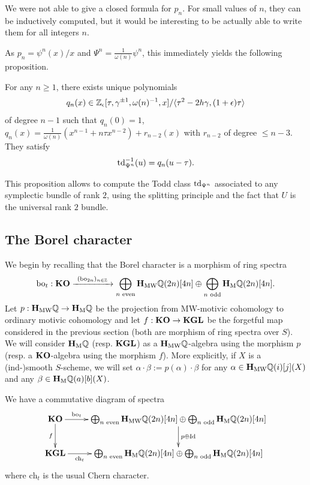 \begin{rem}
We were not able to give a closed formula for $p_n$. For small values of $n$, they can be inductively computed, but it would be interesting to be actually able to write them for all integers $n$.
\end{rem}

As $p_n=\psi^n(x)/x$ and $\Psi^n=\frac 1{\omega(n)}\psi^n$, this immediately yields the following proposition.

\begin{prop}
For any $n\geq 1$, there exists unique polynomials 
\[
q_n(x)\in  \mathbb{Z}_{\epsilon}[\tau,\gamma^{\pm 1},\omega(n)^{-1},x]/\langle \tau^2-2h\gamma,(1+\epsilon)\tau\rangle
\]
of degree $n-1$ such that $q_n(0)=1$, $q_n(x)=\frac 1{\omega(n)}(x^{n-1}+n\tau x^{n-2})+r_{n-2}(x)$ with $r_{n-2}$ of degree $\leq n-3$.  They satisfy 
\[
\operatorname{td}_{\Psi^n}^{-1}(u)=q_n(u-\tau).
\]
\end{prop}

This proposition allows to compute the Todd class $\operatorname{td}_{\Psi^n}$ associated to any symplectic bundle of rank $2$, using the splitting principle and the fact that $U$ is the universal rank $2$ bundle. 



\subsection{The Borel character}

We begin by recalling that the Borel character is a morphism of ring spectra 
\[
\mathrm{bo}_t:\KO \xrightarrow{\ (\mathrm{bo}_{2n})_{n \in \ZZ}\ } \bigoplus_{n \text{ even}} \mathbf{H}_\mathrm{MW}\QQ(2n)[4n] \oplus \bigoplus_{n \text{ odd}} \mathbf{H}_{\mathrm M} \QQ(2n)[4n].
\]
Let $p:\mathbf{H}_\mathrm{MW}\mathbb{Q}\to \mathbf{H}_\mathrm{M}\mathbb{Q}$ be the projection from MW-motivic cohomology to ordinary motivic cohomology and let $f:\mathbf{KO}\to \mathbf{KGL}$ be the forgetful map considered in the previous section (both are  morphism of ring spectra over $S$). We will consider $\mathbf{H}_\mathrm{M}\mathbb{Q}$ (resp. $\mathbf{KGL}$) as a $\mathbf{H}_\mathrm{MW}\mathbb{Q}$-algebra using the morphism $p$ (resp. a $\mathbf{KO}$-algebra using the morphism $f$). More explicitly, if $X$ is a (ind-)smooth $S$-scheme, we will set $\alpha\cdot\beta:=p(\alpha)\cdot \beta$ for any $\alpha\in \mathbf{H}_\mathrm{MW}\mathbb{Q}(i)[j](X)$ and any $\beta \in \mathbf{H}_\mathrm{M}\mathbb{Q}(a)[b](X)$.

We have a commutative diagram of spectra
\begin{equation}\label{eq:commutativecharacters}
\xymatrix{\KO\ar[r]^-{\mathrm{bo}_t}\ar[d]_-f & \bigoplus_{n \text{ even}} \mathbf{H}_\mathrm{MW}\QQ(2n)[4n] \oplus \bigoplus_{n \text{ odd}} \mathbf{H}_{\mathrm M} \QQ(2n)[4n]\ar[d]^-{p\oplus \mathrm{Id}} \\
\KGL\ar[r]_-{\mathrm{ch}_t} & \bigoplus_{n \text{ even}} \mathbf{H}_\mathrm{M}\QQ(2n)[4n] \oplus \bigoplus_{n \text{ odd}} \mathbf{H}_{\mathrm M} \QQ(2n)[4n]
}
\end{equation}
where $\mathrm{ch}_t$ is the usual Chern character.


